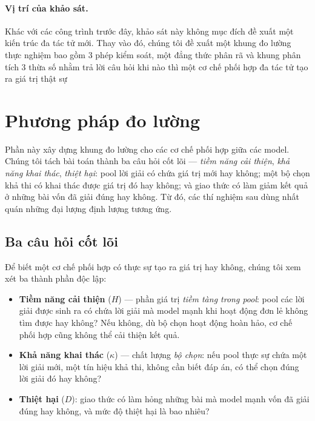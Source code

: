 \documentclass[11pt,a4paper]{article}
\begin{document}
\paragraph{Vị trí của khảo sát.} Khác với các công trình trước đây, khảo sát này không mục đích đề xuất một kiến trúc đa tác tử mới. Thay vào đó, chúng tôi đề xuất một khung đo lường thực nghiệm bao gồm 3 phép kiểm soát, một đẳng thức phân rã và khung phân tích 3 thừa số nhằm trả lời câu hỏi khi nào thì một cơ chế phối hợp đa tác tử tạo ra giá trị thật sự


\section{Phương pháp đo lường}\label{sec:framework}

Phần này xây dựng khung đo lường cho các cơ chế phối hợp giữa các model. Chúng tôi tách bài
toán thành ba câu hỏi cốt lõi --- \emph{tiềm năng cải thiện}, \emph{khả năng khai thác},
\emph{thiệt hại}: pool lời giải có chứa giá trị mới hay không; một bộ chọn khả thi có khai
thác được giá trị đó hay không; và giao thức có làm giảm kết quả ở những bài vốn đã giải đúng
hay không. Từ đó, các thí nghiệm sau dùng nhất quán những đại lượng định lượng tương ứng.

\subsection{Ba câu hỏi cốt lõi}\label{sec:threeq}

Để biết một cơ chế phối hợp có thực sự tạo ra giá trị hay không, chúng tôi xem xét ba thành
phần độc lập:

\begin{itemize}\itemsep1pt
\item \textbf{Tiềm năng cải thiện} ($H$) --- phần giá trị \emph{tiềm tàng trong pool}: pool các lời giải được
      sinh ra có chứa lời giải mà model mạnh khi hoạt động đơn lẻ không tìm được hay không?
      Nếu không, dù bộ chọn hoạt động hoàn hảo, cơ chế phối hợp cũng không thể cải thiện kết
      quả.
\item \textbf{Khả năng khai thác} ($\kappa$) --- chất lượng \emph{bộ chọn}: nếu pool thực sự
      chứa một lời giải mới, một tín hiệu khả thi, không cần biết đáp án, có thể chọn đúng lời
      giải đó hay không?
\item \textbf{Thiệt hại} ($D$): giao thức có làm hỏng những bài mà model mạnh vốn đã giải
      đúng hay không, và mức độ thiệt hại là bao nhiêu?
\end{itemize}
\end{document}
